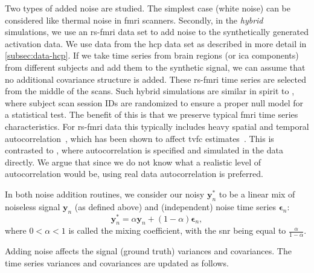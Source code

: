 Two types of added noise are studied.
The simplest case (white noise) can be considered like thermal noise in \gls{fmri} scanners.
Secondly, in the \emph{hybrid} simulations, we use an \gls{rs-fmri} data set to add noise to the synthetically generated activation data.
We use data from the \gls{hcp} data set as described in more detail in \cref{subsec:data-hcp}.
If we take time series from brain regions (or \gls{ica} components) from different subjects and add them to the synthetic signal, we can assume that no additional covariance structure is added.
These \gls{rs-fmri} time series are selected from the middle of the scans.
Such hybrid simulations are similar in spirit to \textcite{Keilholz2013}, where subject scan session IDs are randomized to ensure a proper null model for a statistical test.
The benefit of this is that we preserve typical \gls{fmri} time series characteristics.
For \gls{rs-fmri} data this typically includes heavy spatial and temporal autocorrelation~\parencite{Keilholz2017}, which has been shown to affect \gls{tvfc} estimates~\parencite{Honari2019}.
This is contrasted to \textcite{Thompson2018}, where autocorrelation is specified and simulated in the data directly.
We argue that since we do not know what a realistic level of autocorrelation would be, using real data autocorrelation is preferred.

In both noise addition routines, we consider our noisy $\mathbf{y}_n^*$ to be a linear mix of noiseless signal $\mathbf{y}_n$ (as defined above) and (independent) noise time series $\mathbf{\epsilon}_n$:
\begin{equation}
  \mathbf{y}_n^* = \alpha \mathbf{y}_n + (1 - \alpha) \mathbf{\epsilon}_n,
\end{equation}
where $0 < \alpha < 1$ is called the mixing coefficient, with the \gls{snr} being equal to $\frac{\alpha}{1-\alpha}$.

Adding noise affects the signal (ground truth) variances and covariances.
The time series variances and covariances are updated as follows.

